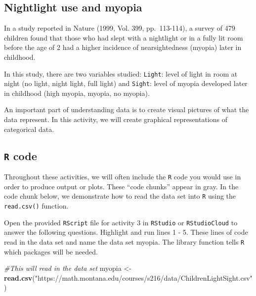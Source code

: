 \documentclass[
]{report}
\newenvironment{Shaded}{\begin{snugshade}}{\end{snugshade}}
\newcommand{\CommentTok}[1]{\textcolor[rgb]{0.56,0.35,0.01}{\textit{#1}}}
\newcommand{\KeywordTok}[1]{\textcolor[rgb]{0.13,0.29,0.53}{\textbf{#1}}}
\newcommand{\NormalTok}[1]{#1}
\newcommand{\StringTok}[1]{\textcolor[rgb]{0.31,0.60,0.02}{#1}}
\begin{document}
\hypertarget{nightlight-use-and-myopia}{%
\subsection{Nightlight use and myopia}\label{nightlight-use-and-myopia}}

In a study reported in Nature (1999, Vol. 399, pp.~113-114), a survey of 479 children found that those who had slept with a nightlight or in a fully lit room before the age of 2 had a higher incidence of nearsightedness (myopia) later in childhood.

In this study, there are two variables studied: \texttt{Light}: level of light in room at night (no light, night light, full light) and \texttt{Sight}: level of myopia developed later in childhood (high myopia, myopia, no myopia).

An important part of understanding data is to create visual pictures of what the data represent. In this activity, we will create graphical representations of categorical data.

\hypertarget{r-code}{%
\subsection*{\texorpdfstring{\texttt{R} code}{R code}}\label{r-code}}

Throughout these activities, we will often include the \texttt{R} code
you would use in order to produce output or plots. These
``code chunks'' appear in gray. In the code chunk below, we
demonstrate how to read the data set into \texttt{R} using the \texttt{read.csv()} function.

Open the provided \texttt{RScript} file for activity 3 in \texttt{RStudio} or \texttt{RStudioCloud} to answer the following questions. Highlight and run lines 1 - 5. These lines of code read in the data set and name the data set myopia. The library function tells \texttt{R} which packages will be needed.

\begin{Shaded}
\begin{Highlighting}[]
\CommentTok{\#This will read in the data set}
\NormalTok{myopia \textless{}{-}}\StringTok{ }\KeywordTok{read.csv}\NormalTok{(}\StringTok{"https://math.montana.edu/courses/s216/data/ChildrenLightSight.csv"}\NormalTok{) }
\end{Highlighting}
\end{Shaded}
\end{document}
